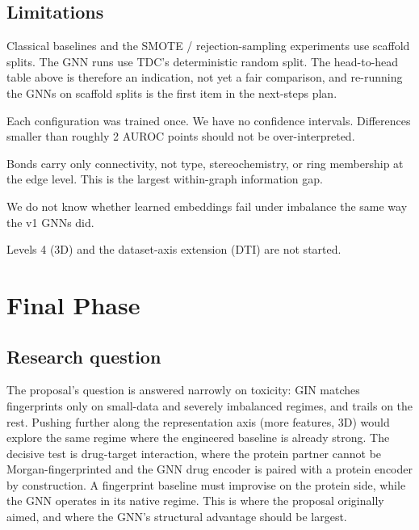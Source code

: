 \documentclass[a4paper,11pt]{article}
\begin{document}
\subsection{Limitations}

\begin{description}[leftmargin=1.5em, style=nextline]
\item[Inconsistent splits across pipelines.] Classical baselines and the SMOTE / rejection-sampling experiments use scaffold splits. The GNN runs use TDC's deterministic random split. The head-to-head table above is therefore an indication, not yet a fair comparison, and re-running the GNNs on scaffold splits is the first item in the next-steps plan.
\item[Single seed.] Each configuration was trained once. We have no confidence intervals. Differences smaller than roughly 2 AUROC points should not be over-interpreted.
\item[No bond features in the GNNs.] Bonds carry only connectivity, not type, stereochemistry, or ring membership at the edge level. This is the largest within-graph information gap.
\item[ChemBERTa tested on one dataset only.] We do not know whether learned embeddings fail under imbalance the same way the v1 GNNs did.
\item[No DTI experiments yet, no 3D yet.] Levels 4 (3D) and the dataset-axis extension (DTI) are not started.
\end{description}

\section{Final Phase}
\label{sec:nextsteps}

\subsection{Research question}

The proposal's question is answered narrowly on toxicity: GIN matches fingerprints only on small-data and severely imbalanced regimes, and trails on the rest. Pushing further along the representation axis (more features, 3D) would explore the same regime where the engineered baseline is already strong. The decisive test is drug-target interaction, where the protein partner cannot be Morgan-fingerprinted and the GNN drug encoder is paired with a protein encoder by construction. A fingerprint baseline must improvise on the protein side, while the GNN operates in its native regime. This is where the proposal originally aimed, and where the GNN's structural advantage should be largest.
\end{document}
